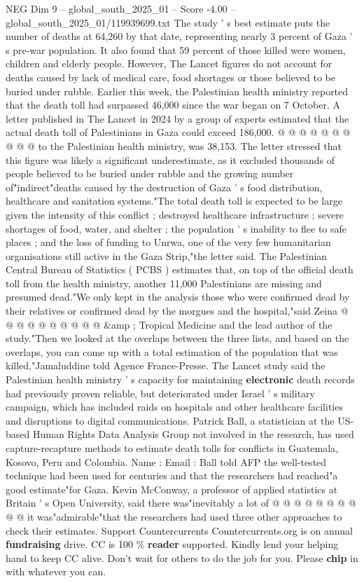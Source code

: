 \begin{textsample}{NEG Dim 9 – global\_south\_2025\_01 – Score -4.00 – global\_south\_2025\_01/119939699.txt}
The study ' s best estimate puts the number of deaths at 64,260 by that date, representing nearly 3 percent of Gaza ' s pre-war population.
It also found that 59 percent of those killed were women, children and elderly people.
However, The Lancet figures do not account for deaths caused by lack of medical care, food shortages or those believed to be buried under rubble.
Earlier this week, the Palestinian health ministry reported that the death toll had surpassed 46,000 since the war began on 7 October.
A letter published in The Lancet in 2024 by a group of experts estimated that the actual death toll of Palestinians in Gaza could exceed 186,000. @ @ @ @ @ @ @ @ @ @ to the Palestinian health ministry, was 38,153.
The letter stressed that this figure was likely a significant underestimate, as it excluded thousands of people believed to be buried under rubble and the growing number of"indirect"deaths caused by the destruction of Gaza ' s food distribution, healthcare and sanitation systems."The total death toll is expected to be large given the intensity of this conflict ; destroyed healthcare infrastructure ; severe shortages of food, water, and shelter ; the population ' s inability to flee to safe places ; and the loss of funding to Unrwa, one of the very few humanitarian organisations still active in the Gaza Strip,"the letter said.
The Palestinian Central Bureau of Statistics ( PCBS ) estimates that, on top of the official death toll from the health ministry, another 11,000 Palestinians are missing and presumed dead."We only kept in the analysis those who were confirmed dead by their relatives or confirmed dead by the morgues and the hospital,"said Zeina @ @ @ @ @ @ @ @ @ @ \&amp ; Tropical Medicine and the lead author of the study."Then we looked at the overlaps between the three lists, and based on the overlaps, you can come up with a total estimation of the population that was killed,"Jamaluddine told Agence France-Presse.
The Lancet study said the Palestinian health ministry ' s capacity for maintaining \textbf{electronic} death records had previously proven reliable, but deteriorated under Israel ' s military campaign, which has included raids on hospitals and other healthcare facilities and disruptions to digital communications.
Patrick Ball, a statistician at the US-based Human Rights Data Analysis Group not involved in the research, has used capture-recapture methods to estimate death tolls for conflicts in Guatemala, Kosovo, Peru and Colombia.
Name : Email : Ball told AFP the well-tested technique had been used for centuries and that the researchers had reached"a good estimate"for Gaza.
Kevin McConway, a professor of applied statistics at Britain ' s Open University, said there was"inevitably a lot of @ @ @ @ @ @ @ @ @ @ it was"admirable"that the researchers had used three other approaches to check their estimates.
Support Countercurrents Countercurrents.org is on annual \textbf{fundraising} drive.
CC is 100 \% \textbf{reader} supported.
Kindly lend your helping hand to keep CC alive.
Don't wait for others to do the job for you.
Please \textbf{chip} in with whatever you can.

\end{textsample}
